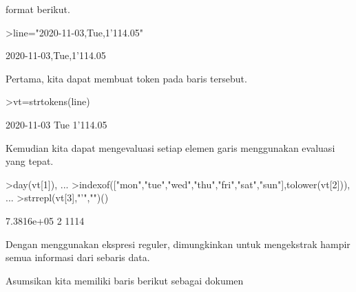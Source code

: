 \documentclass[a4paper,10pt]{article}
\begin{document}
\begin{eulernotebook}
\begin{eulercomment}
\begin{eulercomment}
\begin{eulercomment}
\begin{eulercomment}
\begin{eulercomment}
\begin{eulercomment}
\begin{eulercomment}
\begin{eulercomment}
\begin{eulercomment}
\begin{eulercomment}
\begin{eulercomment}
\begin{eulercomment}
\begin{eulercomment}
\begin{eulercomment}
\begin{eulercomment}
\begin{eulercomment}
\begin{eulercomment}
\begin{eulercomment}
\begin{eulercomment}
\begin{eulercomment}
\begin{eulercomment}
\begin{eulercomment}
\begin{eulercomment}
\begin{eulercomment}
\begin{eulercomment}
\begin{eulercomment}
\begin{eulercomment}
\begin{eulercomment}
\begin{eulercomment}
\begin{eulercomment}
\begin{eulercomment}
\begin{eulercomment}
\begin{eulercomment}
\begin{eulercomment}
\begin{eulercomment}
\begin{eulercomment}
\begin{eulercomment}
\begin{eulercomment}
\begin{eulercomment}
\begin{eulercomment}
\begin{eulercomment}
\begin{eulercomment}
\begin{eulercomment}
\begin{eulercomment}
\begin{eulercomment}
\begin{eulercomment}
\begin{eulercomment}
\begin{eulercomment}
\begin{eulercomment}
\begin{eulercomment}
\begin{eulercomment}
\begin{eulercomment}
\begin{eulercomment}
\begin{eulercomment}
\begin{eulercomment}
\begin{eulercomment}
\begin{eulercomment}
\begin{eulercomment}
\begin{eulercomment}
\begin{eulercomment}
\begin{eulercomment}
\begin{eulercomment}
\begin{eulercomment}
\begin{eulercomment}
\begin{eulercomment}
\begin{eulercomment}
\begin{eulercomment}
\begin{eulercomment}
\begin{eulercomment}
\begin{eulercomment}
\begin{eulercomment}
format berikut.
\end{eulercomment}
\begin{eulerprompt}
>line="2020-11-03,Tue,1'114.05"
\end{eulerprompt}
\begin{euleroutput}
  2020-11-03,Tue,1'114.05
\end{euleroutput}
\begin{eulercomment}
Pertama, kita dapat membuat token pada baris tersebut.
\end{eulercomment}
\begin{eulerprompt}
>vt=strtokens(line)
\end{eulerprompt}
\begin{euleroutput}
  2020-11-03
  Tue
  1'114.05
\end{euleroutput}
\begin{eulercomment}
Kemudian kita dapat mengevaluasi setiap elemen garis menggunakan
evaluasi yang tepat.
\end{eulercomment}
\begin{eulerprompt}
>day(vt[1]),  ...
>indexof(["mon","tue","wed","thu","fri","sat","sun"],tolower(vt[2])),  ...
>strrepl(vt[3],"'","")()
\end{eulerprompt}
\begin{euleroutput}
  7.3816e+05
  2
  1114
\end{euleroutput}
\begin{eulercomment}
Dengan menggunakan ekspresi reguler, dimungkinkan untuk mengekstrak
hampir semua informasi dari sebaris data.

Asumsikan kita memiliki baris berikut sebagai dokumen 
\end{eulercomment}
\end{eulercomment}
\end{eulercomment}
\end{eulercomment}
\end{eulercomment}
\end{eulercomment}
\end{eulercomment}
\end{eulercomment}
\end{eulercomment}
\end{eulercomment}
\end{eulercomment}
\end{eulercomment}
\end{eulercomment}
\end{eulercomment}
\end{eulercomment}
\end{eulercomment}
\end{eulercomment}
\end{eulercomment}
\end{eulercomment}
\end{eulercomment}
\end{eulercomment}
\end{eulercomment}
\end{eulercomment}
\end{eulercomment}
\end{eulercomment}
\end{eulercomment}
\end{eulercomment}
\end{eulercomment}
\end{eulercomment}
\end{eulercomment}
\end{eulercomment}
\end{eulercomment}
\end{eulercomment}
\end{eulercomment}
\end{eulercomment}
\end{eulercomment}
\end{eulercomment}
\end{eulercomment}
\end{eulercomment}
\end{eulercomment}
\end{eulercomment}
\end{eulercomment}
\end{eulercomment}
\end{eulercomment}
\end{eulercomment}
\end{eulercomment}
\end{eulercomment}
\end{eulercomment}
\end{eulercomment}
\end{eulercomment}
\end{eulercomment}
\end{eulercomment}
\end{eulercomment}
\end{eulercomment}
\end{eulercomment}
\end{eulercomment}
\end{eulercomment}
\end{eulercomment}
\end{eulercomment}
\end{eulercomment}
\end{eulercomment}
\end{eulercomment}
\end{eulercomment}
\end{eulercomment}
\end{eulercomment}
\end{eulercomment}
\end{eulercomment}
\end{eulercomment}
\end{eulercomment}
\end{eulercomment}
\end{eulercomment}
\end{eulernotebook}
\end{document}
